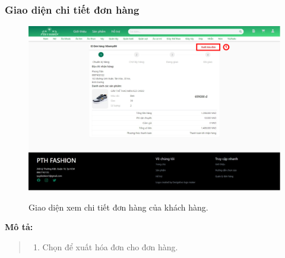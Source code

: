    \subsubsection{Giao diện chi tiết đơn hàng}
    \begin{figure}[!htp]
        \centering
        \includegraphics[width=5in]{img/UI/new_customer/order_detail.png}
        \label{14}
        \newline
        \caption{Giao diện xem chi tiết đơn hàng của khách hàng.}
    \end{figure}
    \textbf{Mô tả:}  
    \begin{quote}
        \begin{enumerate}
            \item Chọn để xuất hóa đơn cho đơn hàng.
        \end{enumerate}
    \end{quote}  
    \newpage

